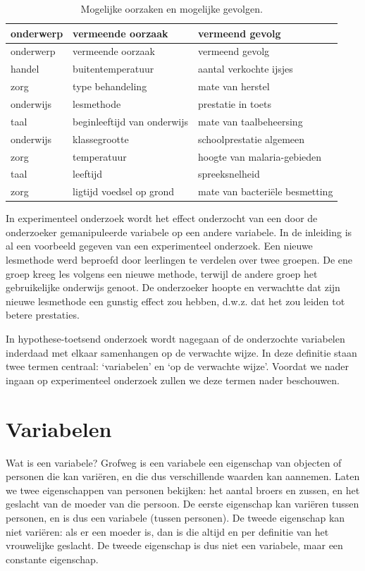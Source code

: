 \documentclass[
]{book}
\begin{document}
\begin{longtable}[]{@{}lll@{}}
\caption{\label{tab:oorzaakgevolg} Mogelijke oorzaken en mogelijke gevolgen.}\tabularnewline
\toprule\noalign{}
onderwerp & vermeende oorzaak & vermeend gevolg \\
\midrule\noalign{}
\endfirsthead
\toprule\noalign{}
onderwerp & vermeende oorzaak & vermeend gevolg \\
\midrule\noalign{}
\endhead
\bottomrule\noalign{}
\endlastfoot
handel & buitentemperatuur & aantal verkochte ijsjes \\
zorg & type behandeling & mate van herstel \\
onderwijs & lesmethode & prestatie in toets \\
taal & beginleeftijd van onderwijs & mate van taalbeheersing \\
onderwijs & klassegrootte & schoolprestatie algemeen \\
zorg & temperatuur & hoogte van malaria-gebieden \\
taal & leeftijd & spreeksnelheid \\
zorg & ligtijd voedsel op grond & mate van bacteriële besmetting \\
\end{longtable}

In experimenteel onderzoek wordt het effect onderzocht van een door de
onderzoeker gemanipuleerde variabele op een andere variabele. In de
inleiding is al een voorbeeld gegeven van een experimenteel onderzoek.
Een nieuwe lesmethode werd beproefd door leerlingen te verdelen over
twee groepen. De ene groep kreeg les volgens een nieuwe methode, terwijl
de andere groep het gebruikelijke onderwijs genoot. De onderzoeker
hoopte en verwachtte dat zijn nieuwe lesmethode een gunstig effect zou
hebben, d.w.z. dat het zou leiden tot betere prestaties.

In hypothese-toetsend onderzoek wordt nagegaan of de onderzochte
variabelen inderdaad met elkaar samenhangen op de verwachte wijze. In
deze definitie staan twee termen centraal: `variabelen' en `op de
verwachte wijze'. Voordat we nader ingaan op experimenteel onderzoek
zullen we deze termen nader beschouwen.

\section{Variabelen}\label{sec:variabelen}

Wat is een variabele? Grofweg is een variabele een eigenschap van
objecten of personen die kan variëren, en die dus verschillende waarden
kan aannemen. Laten we twee eigenschappen van personen bekijken: het
aantal broers en zussen, en het geslacht van de moeder van die persoon.
De eerste eigenschap kan variëren tussen personen, en is dus een
variabele (tussen personen). De tweede eigenschap kan niet variëren: als
er een moeder is, dan is die altijd en per definitie van het vrouwelijke
geslacht. De tweede eigenschap is dus niet een variabele, maar een
constante eigenschap.
\end{document}
